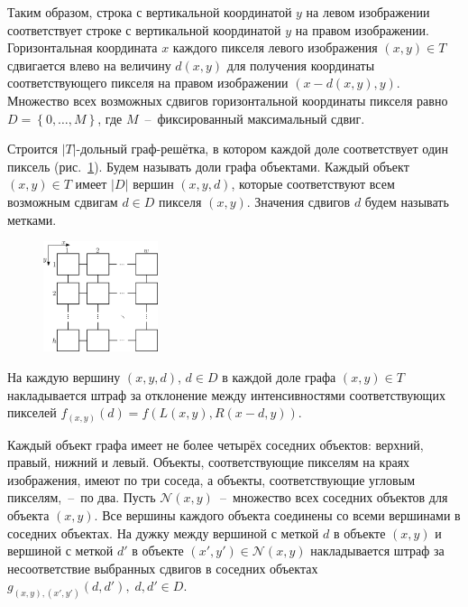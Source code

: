 \documentclass{ConfFTI}
\begin{document}
Таким образом, строка с вертикальной координатой $y$
на левом изображении соответствует
строке с вертикальной координатой $y$ на правом изображении.
Горизонтальная координата $x$ каждого пикселя левого изображения
$\left( x, y \right) \in T$
сдвигается влево на величину $d \left( x, y \right)$
для получения координаты соответствующего пикселя на правом изображении
$\left( x - d \left( x, y \right), y \right)$.
Множество всех возможных сдвигов горизонтальной координаты пикселя
равно $D = \left\{ 0, \dotsc, M \right\}$,
где $M$~--~фиксированный максимальный сдвиг.

Строится $\left| T \right|$-дольный граф-решётка,
в котором каждой доле соответствует один пиксель
(рис.~\ref{fig:grid:graph:pixels}).
Будем называть доли графа объектами.
Каждый объект $\left( x, y \right) \in T$ имеет $\left| D \right|$ вершин
$\left(x, y , d \right)$, которые соответствуют всем возможным сдвигам
$d \in D$ пикселя $\left( x, y \right)$.
Значения сдвигов $d$ будем называть метками.

\begin{figure}[h]
  \centering
  \includegraphics[width=0.3\textwidth]{images/grid_graph_pixels}
  \label{fig:grid:graph:pixels}
\end{figure}

На каждую вершину $\left( x, y, d \right)$, $d \in D$ в каждой доле графа
$\left(x, y \right) \in T$
накладывается штраф за отклонение между интенсивностями соответствующих пикселей
$f_{\left(x, y \right)}\left(d \right) =
    f \left(
        L \left(x, y \right),
        R \left( x - d, y \right)
    \right)$.

Каждый объект графа имеет не более четырёх соседних объектов:
верхний, правый, нижний и левый.
Объекты, соответствующие пикселям на краях изображения,
имеют по три соседа, а объекты,
соответствующие угловым пикселям,~--~по два.
Пусть $\mathcal{N} \left(x, y \right)$~--~множество всех соседних объектов для
объекта $\left(x, y \right)$.
Все вершины каждого объекта соединены со всеми вершинами в соседних объектах.
На дужку между вершиной с меткой $d$ в объекте $\left( x, y \right)$
и вершиной с меткой $d'$ в объекте
$\left(x', y' \right) \in \mathcal{N}\left(x, y \right)$
накладывается штраф за несоответствие выбранных сдвигов в соседних объектах
$g_{\left(x, y \right), \left(x', y' \right)} \left(d, d' \right), \;
    d, d' \in D$.
\end{document}
